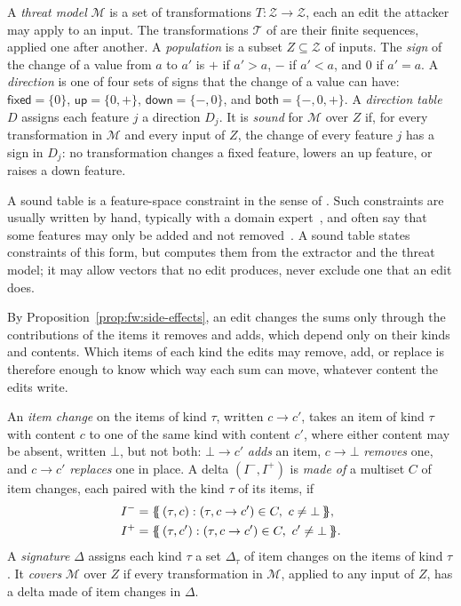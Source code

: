 \label{def:fw:directions}
{
A \emph{threat model} $\mathcal{M}$ is a set of transformations $T: \mathcal{Z} \to \mathcal{Z}$, each an edit
the attacker may apply to an input. The transformations $\mathcal{T}$ of  are their finite
sequences, applied one after another. A \emph{population} is a subset
$Z \subseteq \mathcal{Z}$ of inputs. The \emph{sign} of the change of a value from $a$ to $a'$ is $+$ if $a' > a$,
$-$ if $a' < a$, and $0$ if $a' = a$. A \emph{direction} is one of four sets of signs that the change of a value can
have: $\mathsf{fixed} = \{0\}$, $\mathsf{up} = \{0, +\}$, $\mathsf{down} = \{-, 0\}$, and $\mathsf{both} = \{-, 0,
+\}$. A \emph{direction table} $D$ assigns each feature $j$ a direction $D_j$. It is \emph{sound} for $\mathcal{M}$
over $Z$ if, for every transformation in $\mathcal{M}$ and every input of $Z$, the change of every feature $j$ has a
sign in $D_j$: no transformation changes a fixed feature, lowers an up feature, or raises a down feature.
}

\noindent A sound table is a feature-space constraint in the sense of . Such constraints are
usually written by hand, typically with a domain expert~\cite{dyrmishi2023empirical}, and often say that some features
may only be added and not removed~\cite{pierazzi2020intriguing}. A sound table states constraints of this form, but
computes them from the extractor and the threat model; it may allow vectors that no edit produces, never exclude one
that an edit does.

By Proposition~\ref{prop:fw:side-effects}, an edit changes the sums only through the contributions of the items it
removes and adds, which depend only on their kinds and contents. Which items of each kind the edits may remove, add, or
replace is therefore enough to know which way each sum can move, whatever content the edits write.

\label{def:fw:signature}
{
An \emph{item change} on the items of kind $\tau$, written
$c \to c'$, takes an item of kind $\tau$ with content $c$ to one of the same kind with content $c'$, where either
content may be absent, written $\bot$, but not both: $\bot \to c'$ \emph{adds} an item, $c \to \bot$ \emph{removes}
one, and $c \to c'$ \emph{replaces} one in place. A delta $(I^-, I^+)$ is \emph{made of} a multiset $C$ of item changes,
each paired with the kind $\tau$ of its items, if
\begin{equation}
  \label{eq:fw:made-of}
  \begin{aligned}
    I^- &= \mset{(\tau, c) : (\tau, c \to c') \in C,\ c \neq \bot}, \\
    I^+ &= \mset{(\tau, c') : (\tau, c \to c') \in C,\ c' \neq \bot}.
  \end{aligned}
\end{equation}
A \emph{signature} $\Delta$ assigns each kind $\tau$ a set $\Delta_\tau$ of item changes on the items of kind $\tau$.
It \emph{covers} $\mathcal{M}$ over $Z$ if every transformation in $\mathcal{M}$, applied to any input of $Z$, has a
delta made of item changes in $\Delta$.
}


